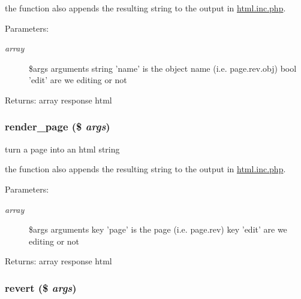 the function also appends the resulting string to the output in \hyperlink{html_8inc_8php}{html.inc.php}. \begin{Desc}
\item[Parameters:]
\begin{description}
\item[{\em array}]\$args arguments string 'name' is the object name (i.e. page.rev.obj) bool 'edit' are we editing or not \end{description}
\end{Desc}
\begin{Desc}
\item[Returns:]array response html \end{Desc}
\hypertarget{module__glue_8inc_8php_ab1981a767de519c6c4afb946d748d0a}{
\subsubsection[{render\_\-page}]{\setlength{\rightskip}{0pt plus 5cm}render\_\-page (\$ {\em args})}}
\label{module__glue_8inc_8php_ab1981a767de519c6c4afb946d748d0a}


turn a page into an html string

the function also appends the resulting string to the output in \hyperlink{html_8inc_8php}{html.inc.php}. \begin{Desc}
\item[Parameters:]
\begin{description}
\item[{\em array}]\$args arguments key 'page' is the page (i.e. page.rev) key 'edit' are we editing or not \end{description}
\end{Desc}
\begin{Desc}
\item[Returns:]array response html \end{Desc}
\hypertarget{module__glue_8inc_8php_e69e25beb40feedc02d3b850587d20cc}{
\subsubsection[{revert}]{\setlength{\rightskip}{0pt plus 5cm}revert (\$ {\em args})}}
\label{module__glue_8inc_8php_e69e25beb40feedc02d3b850587d20cc}



